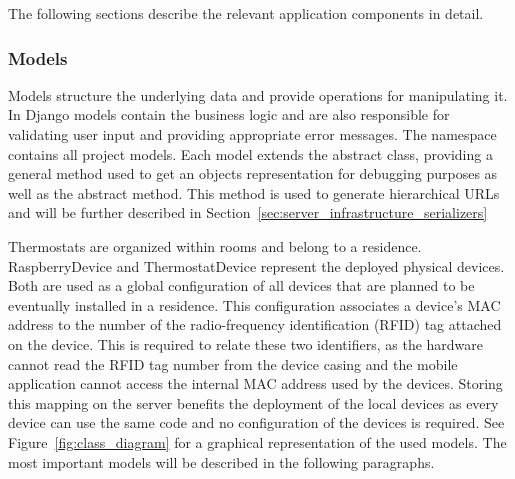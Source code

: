 The following sections describe the relevant application components in detail.

\subsubsection{Models}
\label{sec:server_infrastructure_models}

Models structure the underlying data and provide operations for manipulating it.
In Django models contain the business logic and are also responsible for validating user input and providing appropriate error messages.
The  namespace contains all project models.
Each model extends the abstract  class, providing a general method used to get an objects representation for debugging purposes as well as the abstract  method.
This method is used to generate hierarchical URLs and will be further described in Section~\ref{sec:server_infrastructure_serializers}

Thermostats are organized within rooms and belong to a residence.
RaspberryDevice and ThermostatDevice represent the deployed physical devices.
Both are used as a global configuration of all devices that are planned to be eventually installed in a residence.
This configuration associates a device's MAC address to the number of the radio-frequency identification (RFID) tag attached on the device.
This is required to relate these two identifiers, as the hardware cannot read the RFID tag number from the device casing and the mobile application cannot access the internal MAC address used by the devices.
Storing this mapping on the server benefits the deployment of the local devices as every device can use the same code and no configuration of the devices is required.
See Figure~\ref{fig:class_diagram} for a graphical representation of the used models.
The most important models will be described in the following paragraphs.

